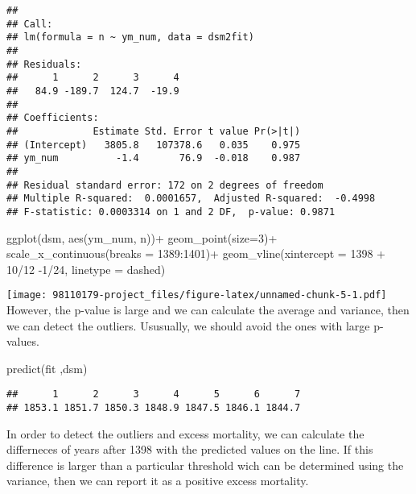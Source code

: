 \documentclass[
]{article}
\newenvironment{Shaded}{\begin{snugshade}}{\end{snugshade}}
\newcommand{\AttributeTok}[1]{\textcolor[rgb]{0.77,0.63,0.00}{#1}}
\newcommand{\DecValTok}[1]{\textcolor[rgb]{0.00,0.00,0.81}{#1}}
\newcommand{\FunctionTok}[1]{\textcolor[rgb]{0.00,0.00,0.00}{#1}}
\newcommand{\NormalTok}[1]{#1}
\newcommand{\SpecialCharTok}[1]{\textcolor[rgb]{0.00,0.00,0.00}{#1}}
\newcommand{\StringTok}[1]{\textcolor[rgb]{0.31,0.60,0.02}{#1}}
\begin{document}
\begin{verbatim}
## 
## Call:
## lm(formula = n ~ ym_num, data = dsm2fit)
## 
## Residuals:
##      1      2      3      4 
##   84.9 -189.7  124.7  -19.9 
## 
## Coefficients:
##             Estimate Std. Error t value Pr(>|t|)
## (Intercept)   3805.8   107378.6   0.035    0.975
## ym_num          -1.4       76.9  -0.018    0.987
## 
## Residual standard error: 172 on 2 degrees of freedom
## Multiple R-squared:  0.0001657,  Adjusted R-squared:  -0.4998 
## F-statistic: 0.0003314 on 1 and 2 DF,  p-value: 0.9871
\end{verbatim}

\begin{Shaded}
\begin{Highlighting}[]
\FunctionTok{ggplot}\NormalTok{(dsm, }\FunctionTok{aes}\NormalTok{(ym\_num, n))}\SpecialCharTok{+}
  \FunctionTok{geom\_point}\NormalTok{(}\AttributeTok{size=}\DecValTok{3}\NormalTok{)}\SpecialCharTok{+}
  \FunctionTok{scale\_x\_continuous}\NormalTok{(}\AttributeTok{breaks =} \DecValTok{1389}\SpecialCharTok{:}\DecValTok{1401}\NormalTok{)}\SpecialCharTok{+}
  \FunctionTok{geom\_vline}\NormalTok{(}\AttributeTok{xintercept =} \DecValTok{1398} \SpecialCharTok{+} \DecValTok{10}\SpecialCharTok{/}\DecValTok{12} \SpecialCharTok{{-}}\DecValTok{1}\SpecialCharTok{/}\DecValTok{24}\NormalTok{, }\AttributeTok{linetype =} \StringTok{\textquotesingle{}dashed\textquotesingle{}}\NormalTok{)}
\end{Highlighting}
\end{Shaded}

\texttt{[image: 98110179-project\_files/figure-latex/unnamed-chunk-5-1.pdf]}
However, the p-value is large and we can calculate the average and
variance, then we can detect the outliers. Ususually, we should avoid
the ones with large p-values.

\begin{Shaded}
\begin{Highlighting}[]
\FunctionTok{predict}\NormalTok{(fit ,dsm)}
\end{Highlighting}
\end{Shaded}

\begin{verbatim}
##      1      2      3      4      5      6      7 
## 1853.1 1851.7 1850.3 1848.9 1847.5 1846.1 1844.7
\end{verbatim}

In order to detect the outliers and excess mortality, we can calculate
the differneces of years after 1398 with the predicted values on the
line. If this difference is larger than a particular threshold wich can
be determined using the variance, then we can report it as a positive
excess mortality.
\end{document}
